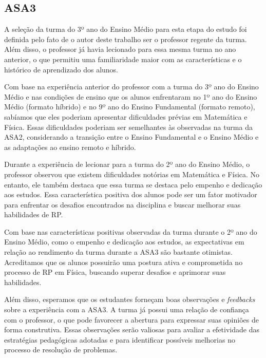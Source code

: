 \subsection{ASA3} \label{subsec:asa3}

A seleção da turma do 3º ano do Ensino Médio para esta etapa do estudo foi definida pelo fato de o autor deste trabalho ser o professor regente da turma. Além disso, o professor já havia lecionado para essa mesma turma no ano anterior, o que permitiu uma familiaridade maior com as características e o histórico de aprendizado dos alunos.

Com base na experiência anterior do professor com a turma do 3º ano do Ensino Médio e nas condições de ensino que os alunos enfrentaram no 1º ano do Ensino Médio (formato híbrido) e no 9º ano do Ensino Fundamental (formato remoto), sabíamos que eles poderiam apresentar dificuldades prévias em Matemática e Física. Essas dificuldades poderiam ser semelhantes às observadas na turma da ASA2, considerando a transição entre o Ensino Fundamental e o Ensino Médio e as adaptações ao ensino remoto e híbrido.

Durante a experiência de lecionar para a turma do 2º ano do Ensino Médio, o professor observou que existem dificuldades notórias em Matemática e Física. No entanto, ele também destaca que essa turma se destaca pelo empenho e dedicação aos estudos. Essa característica positiva dos alunos pode ser um fator motivador para enfrentar os desafios encontrados na disciplina e buscar melhorar suas habilidades de RP.

Com base nas características positivas observadas da turma durante o 2º ano do Ensino Médio, como o empenho e dedicação aos estudos, as expectativas em relação ao rendimento da turma durante a ASA3 são bastante otimistas. Acreditamos que os alunos possuirão uma postura ativa e comprometida no processo de RP em Física, buscando superar desafios e aprimorar suas habilidades.

Além disso, esperamos que os estudantes forneçam boas observações e \textit{feedbacks} sobre a experiência com a ASA3. A turma já possui uma relação de confiança com o professor, o que pode favorecer a abertura para expressar suas opiniões de forma construtiva. Essas observações serão valiosas para avaliar a efetividade das estratégias pedagógicas adotadas e para identificar possíveis melhorias no processo de resolução de problemas.


